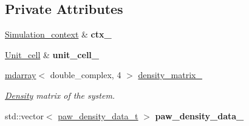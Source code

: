 \subsection*{Private Attributes}
\begin{DoxyCompactItemize}
\item 
\hypertarget{classsirius_1_1_density_a212af02a98fc061951f927bdf4a7d5f4}{}\hyperlink{classsirius_1_1_simulation__context}{Simulation\+\_\+context} \& {\bfseries ctx\+\_\+}\label{classsirius_1_1_density_a212af02a98fc061951f927bdf4a7d5f4}

\item 
\hypertarget{classsirius_1_1_density_a3211e17c9026accf293bdef96b96edcb}{}\hyperlink{classsirius_1_1_unit__cell}{Unit\+\_\+cell} \& {\bfseries unit\+\_\+cell\+\_\+}\label{classsirius_1_1_density_a3211e17c9026accf293bdef96b96edcb}

\item 
\hyperlink{classsddk_1_1mdarray}{mdarray}$<$ double\+\_\+complex, 4 $>$ \hyperlink{classsirius_1_1_density_aae98b9da0334e70ab463a59ed0afe75d}{density\+\_\+matrix\+\_\+}
\begin{DoxyCompactList}\small\item\em \hyperlink{classsirius_1_1_density}{Density} matrix of the system. \end{DoxyCompactList}\item 
\hypertarget{classsirius_1_1_density_a34b9631d36848183f8cf280544449dd1}{}std\+::vector$<$ \hyperlink{structsirius_1_1_density_1_1paw__density__data__t}{paw\+\_\+density\+\_\+data\+\_\+t} $>$ {\bfseries paw\+\_\+density\+\_\+data\+\_\+}\label{classsirius_1_1_density_a34b9631d36848183f8cf280544449dd1}


\end{DoxyCompactItemize}
